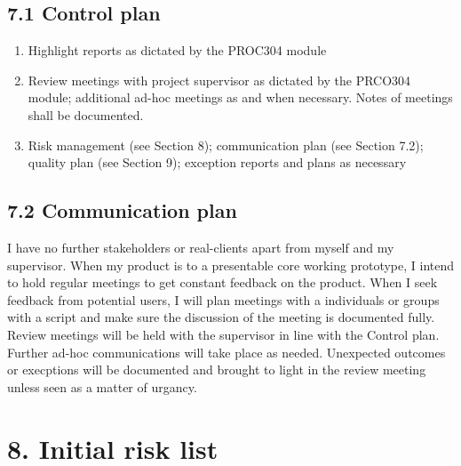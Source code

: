 \documentclass[a4paper]{article}
\begin{document}
\subsection{7.1 Control plan}

\begin{enumerate}
    \item Highlight reports as dictated by the PROC304 module
    \item Review meetings with project supervisor as dictated by the PRCO304 module; additional ad-hoc meetings as and when necessary. Notes of meetings shall be documented.
    \item Risk management (see Section 8); communication plan (see Section 7.2); quality plan (see Section 9); exception reports and plans as necessary
\end{enumerate}

\subsection{7.2 Communication plan}

I have no further stakeholders or real-clients apart from myself and my supervisor. When my product is to a presentable core working prototype, I intend to hold regular meetings to get constant feedback on the product. When I seek feedback from potential users, I will plan meetings with a individuals or groups with a script and make sure the discussion of the meeting is documented fully. Review meetings will be held with the supervisor in line with the Control plan. Further ad-hoc communications will take place as needed. Unexpected outcomes or execptions will be documented and brought to light in the review meeting unless seen as a matter of urgancy.

\section{8. Initial risk list}
\end{document}
